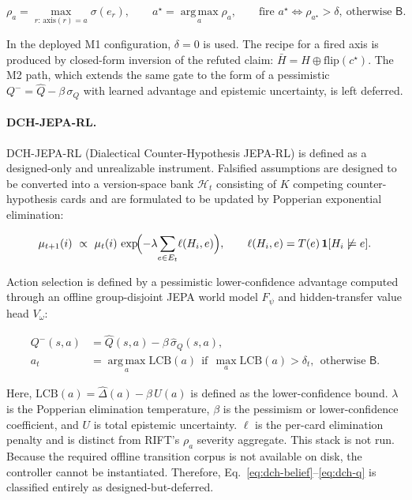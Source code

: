 \documentclass{article}
\numberwithin{equation}{section}  %
\theoremstyle{definition}
\newcommand{\armB}{\textsf{B}}
\begin{document}
\begin{equation}\label{eq:rift}
\rho_a=\!\!\max_{r:\,\mathrm{axis}(r)=a}\!\!\sigma(e_r),
\qquad
a^\star=\operatorname*{arg\,max}_a \rho_a,
\qquad
\text{fire } a^\star \iff \rho_{a^\star}>\delta,\ \text{otherwise } \armB .
\end{equation}

In the deployed M1 configuration, $\delta{=}0$ is used. The recipe for a fired axis is
produced by closed-form inversion of the refuted claim:
$\bar H=H\oplus\mathrm{flip}(c^\star)$. The M2 path, which extends the same gate to the form
of a pessimistic $Q^-=\hat Q-\beta\,\sigma_Q$ with learned advantage and epistemic
uncertainty, is left deferred.

\paragraph{DCH-JEPA-RL.}
DCH-JEPA-RL (Dialectical Counter-Hypothesis JEPA-RL) is defined as a designed-only and
unrealizable instrument. Falsified assumptions are designed to be converted into a
version-space bank $\mathcal{H}_t$ consisting of $K$ competing counter-hypothesis cards and
are formulated to be updated by Popperian exponential elimination:

\begin{equation}\label{eq:dch-belief}
\mu_{t+1}(i)\ \propto\ \mu_t(i)\,\exp\!\Bigl(-\lambda\!\sum_{e\in E_t}\!\ell(H_i,e)\Bigr),
\qquad
\ell(H_i,e)=T(e)\,\mathbf{1}[H_i\not\models e] .
\end{equation}

Action selection is defined by a pessimistic lower-confidence advantage computed through an
offline group-disjoint JEPA world model $F_\psi$ and hidden-transfer value head $V_\omega$:

\begin{equation}\label{eq:dch-q}
\begin{aligned}
Q^-(s,a)&=\hat Q(s,a)-\beta\,\hat\sigma_Q(s,a),\\
a_t&=\operatorname*{arg\,max}_a \mathrm{LCB}(a)\ \ \text{if}\ \ \max_a \mathrm{LCB}(a)>\delta_t,\ \ \text{otherwise } \armB .
\end{aligned}
\end{equation}

Here, $\mathrm{LCB}(a)=\widehat{\Delta}(a)-\beta\,U(a)$ is defined as the lower-confidence
bound. $\lambda$ is the Popperian elimination temperature, $\beta$ is the pessimism or
lower-confidence coefficient, and $U$ is total epistemic uncertainty. $\ell$ is the per-card
elimination penalty and is distinct from RIFT's $\rho_a$ severity aggregate. This stack is not
run. Because the required offline transition corpus is not available on disk, the controller
cannot be instantiated. Therefore, Eq.~\eqref{eq:dch-belief}--\eqref{eq:dch-q} is
classified entirely as designed-but-deferred.
\end{document}
